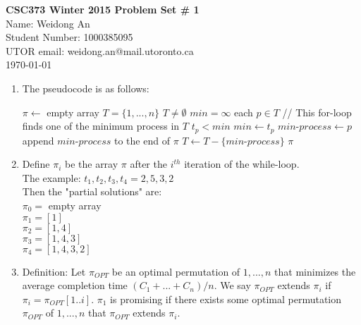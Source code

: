 \documentclass[11pt]{article}
\begin{document}
\begin{center}
{\bf \Large \bf CSC373 Winter 2015 Problem Set \# 1}\\
Name: Weidong An\\
Student Number: 1000385095\\
UTOR email: weidong.an@mail.utoronto.ca\\
\today\\
\end{center}

\begin{enumerate}[label=(\alph*)]
\item\label{algo}%
The pseudocode is as follows:
\begin{codebox}

\li $\pi \gets$ empty array
\li $T = \{1, ..., n\}$
\li \While $T \neq \emptyset$
\li     \Then $min = \infty$
\li     \For each $p \in T$    // This for-loop finds one of the minimum process in $T$
\li            \Then \If $t_p < min$
\li                  \Then $min \gets t_p$
\li                        $min$-$process \gets p$\End\End
\li      append $min$-$process$ to the end of $\pi$
\li      $T \gets T - \{min$-$process\}$\End
\li \Return $\pi$



\end{codebox}


\item\label{partial}%
Define $\pi_i$ be the array $\pi$ after the $i^{th}$ iteration of the while-loop.\\
The example: $t_1, t_2, t_3, t_4=2, 5, 3, 2$\\
Then the "partial solutions" are:\\
$\pi_0 =$ empty array\\
$\pi_1 = [1]$\\
$\pi_2 = [1, 4]$\\
$\pi_3 = [1, 4, 3]$\\
$\pi_4 = [1, 4, 3, 2]$\\



\item\label{promising}%
Definition: Let $\pi_{OPT}$ be an optimal permutation of $1, ..., n$ that minimizes the average completion time $(C_1+...+C_n)/n$. We say $\pi_{OPT}$ extends $\pi_i$ if $\pi_i = \pi_{OPT}[1..i]$. $\pi_1$ is promising if there exists some optimal permutation $\pi_{OPT} $ of $1, ..., n$ that $\pi_{OPT}$ extends $\pi_i$.



\end{enumerate}
\end{document}
